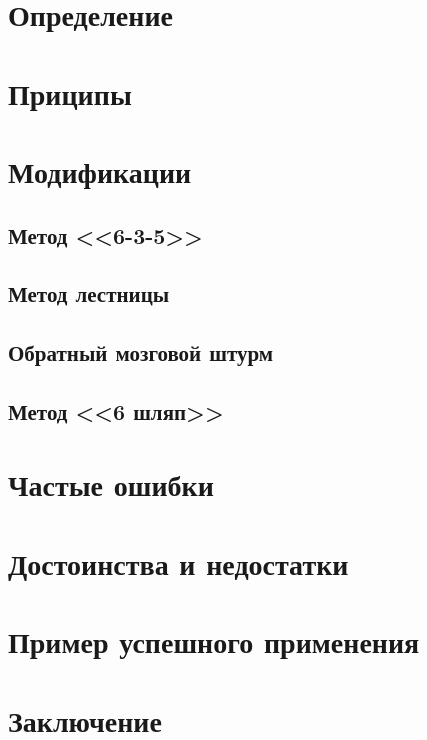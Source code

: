 \documentclass[a4paper,12pt]{article}
\begin{document}


\tableofcontents
\newpage

\section{Определение}


\section{Приципы}


\section{Модификации}

	\subsection{Метод <<6-3-5>>}
	

	\subsection{Метод лестницы}
	

	\subsection{Обратный мозговой штурм}
	

	\subsection{Метод <<6 шляп>>}
	

\section{Частые ошибки}


\section{Достоинства и недостатки}


\section{Пример успешного применения}


\section{Заключение}

\end{document}
